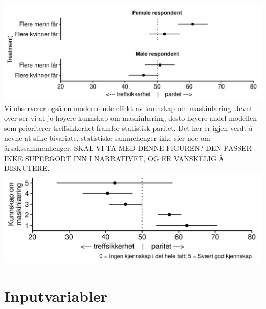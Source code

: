 \documentclass[
]{book}
\begin{document}
\includegraphics{figs/png/fig_parity_treat_avg_by_gender.png}
Vi observerer også en modererende effekt av kunnskap om maskinlæring:
Jevnt over ser vi at jo høyere kunnskap om maskinlæring, desto høyere andel modellen som prioriterer treffsikkerhet framfor statistisk paritet.
Det her er igjen verdt å nevne at slike bivariate, statistiske sammehenger ikke sier noe om årsakssammenhenger.
SKAL VI TA MED DENNE FIGUREN? DEN PASSER IKKE SUPERGODT INN I NARRATIVET, OG ER VANSKELIG Å DISKUTERE.
\includegraphics{figs/png/fig_parity_treat_avg_by_ml_know.png}

\hypertarget{input}{%
\chapter{Inputvariabler}\label{input}}
\end{document}
